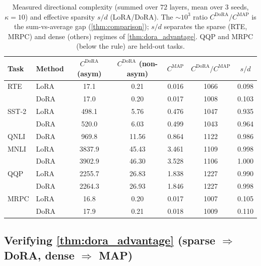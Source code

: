 \documentclass[10pt]{article}
\begin{document}
\begin{table}[t]
\centering
\caption{Measured directional complexity (summed over $72$ layers, mean over $3$
seeds, $\kappa{=}10$) and effective sparsity $s/d$ (LoRA/DoRA). The $\sim$$10^3$ ratio
$C^{\mathrm{DoRA}}/C^{\mathrm{MAP}}$ is the sum-vs-average gap (\cref{thm:comparison});
$s/d$ separates the sparse (RTE, MRPC) and dense (others) regimes of
\cref{thm:dora_advantage}. QQP and MRPC (below the rule) are held-out tasks.}
\label{tab:cterms}
\small
\begin{tabular}{llccccc}
\toprule
Task & Method & $C^{\mathrm{DoRA}}$ (asym) & $C^{\mathrm{DoRA}}$ (non-asym) & $C^{\mathrm{MAP}}$ & $C^{\mathrm{DoRA}}/C^{\mathrm{MAP}}$ & $s/d$ \\
\midrule
RTE   & LoRA & 17.1   & 0.21  & 0.016 & 1066 & 0.098 \\
      & DoRA & 17.0   & 0.20  & 0.017 & 1008 & 0.103 \\
SST-2 & LoRA & 498.1  & 5.76  & 0.476 & 1047 & 0.935 \\
      & DoRA & 520.0  & 6.03  & 0.499 & 1043 & 0.964 \\
QNLI  & DoRA & 969.8  & 11.56 & 0.864 & 1122 & 0.986 \\
MNLI  & LoRA & 3837.9 & 45.43 & 3.461 & 1109 & 0.998 \\
      & DoRA & 3902.9 & 46.30 & 3.528 & 1106 & 1.000 \\
\midrule
QQP   & LoRA & 2255.7 & 26.83 & 1.838 & 1227 & 0.990 \\
      & DoRA & 2264.3 & 26.93 & 1.846 & 1227 & 0.998 \\
MRPC  & LoRA & 16.8   & 0.20  & 0.017 & 1007 & 0.105 \\
      & DoRA & 17.9   & 0.21  & 0.018 & 1009 & 0.110 \\
\bottomrule
\end{tabular}
\end{table}

\subsection{Verifying \cref{thm:dora_advantage} (sparse $\Rightarrow$ DoRA, dense $\Rightarrow$ MAP)}
\end{document}
